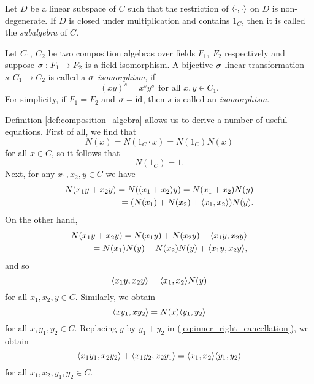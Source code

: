 Let $D$ be a linear subspace of $C$ such that the restriction of $\langle \cdot, \cdot \rangle$ on $D$ 
is non-degenerate. If $D$ is closed under multiplication and contains $1_C$, then it is called
the \textit{subalgebra} of $C$. 

Let $C_1,\ C_2$ be two composition algebras over fields $F_1,\ F_2$ respectively and 
suppose $\sigma: F_1 \rightarrow F_2$ is a field isomorphism. A bijective $\sigma$-linear transformation
$s : C_1 \rightarrow C_2$ is called a \textit{$\sigma$-isomorphism}, if 
\begin{equation}
	(xy)^s = x^s y^s\ \ \mbox{for all } x,y \in C_1. 
\end{equation}
For simplicity, if $F_1 = F_2$ and $\sigma = \mathrm{id}$, then $s$ is called an \textit{isomorphism}.

Definition \ref{def:composition_algebra} allows us to derive a number of useful equations. 
First of all, we find that
\begin{equation*}
	N( x ) = N( 1_C \cdot x ) = N(1_C) N(x)
\end{equation*}
for all $x \in C$, so it follows that
\begin{equation}
	N(1_C) = 1.
\end{equation}
Next, for any $x_1,x_2,y \in C$ we have
\begin{align*}
	N(x_1 y + x_2 y) = N((x_1+x_2) y) = N(x_1+x_2) N(y) \\
		= (N(x_1) + N(x_2) + \langle x_1, x_2 \rangle) N(y).
\end{align*}
On the other hand,
\begin{align*}
	N(x_1 y + x_2 y) = N(x_1 y) + N(x_2 y) + \langle x_1 y, x_2 y \rangle \\
		= N(x_1)N(y) + N(x_2)N(y) + \langle x_1 y, x_2 y \rangle,
\end{align*}
and so
\begin{equation}
	\label{eq:inner_right_cancellation}
	\langle x_1 y, x_2 y \rangle = \langle x_1, x_2 \rangle N(y)
\end{equation}
for all $x_1, x_2,y \in C$. Similarly, we obtain
\begin{equation}
	\langle x y_1, x y_2 \rangle = N(x)\langle y_1, y_2 \rangle
\end{equation}
for all $x,y_1,y_2 \in C$. Replacing $y$ by $y_1+y_2$ in 
(\ref{eq:inner_right_cancellation}), we obtain
\begin{equation}
	\langle x_1 y_1, x_2 y_2 \rangle + \langle x_1 y_2, x_2 y_1 \rangle = \langle x_1, x_2 \rangle \langle y_1, y_2 \rangle
\end{equation}
for all $x_1,x_2,y_1,y_2 \in C$. 

